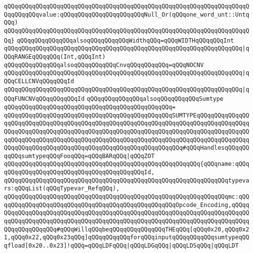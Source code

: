 \verb|qQQqqQQqqQQqqQQqqQQqqQQqqQQqqQQqqQQqqQQqqQQqqQQqqQQqqQQqqQQqqQQqqQQqqQQqqQQqqQQqvalue:qQQqqQQqqQQqqQQqqQQqqQQqNull_Or(qQQqone_word_unt::UntqQQq)|\newline
\verb|qQQqqQQqqQQqqQQqqQQqqQQqqQQqqQQqqQQqqQQqqQQqqQQqqQQqqQQqqQQqqQQqqQQqqQQq}|\newline
\newline
\verb|qQQqqQQqqQQqqQQqalsoqQQqqQQqqQQqWidthqQQq=qQQqWIDTHqQQqqQQqInt|\newline
\verb|qQQqqQQqqQQqqQQqqQQqqQQqqQQqqQQqqQQqqQQqqQQqqQQqqQQqqQQqqQQqqQQqqQQq|\verb#|qQQqRANGEqQQqqQQq(Int,qQQqInt)#\newline
\newline
\verb|qQQqqQQqqQQqqQQqalsoqQQqqQQqqQQqCnvqQQqqQQqqQQq=qQQqNOCNV|\newline
\verb|qQQqqQQqqQQqqQQqqQQqqQQqqQQqqQQqqQQqqQQqqQQqqQQqqQQqqQQqqQQqqQQqqQQq|\verb#|qQQqCELLCNVqQQqqQQqId#\newline
\verb|qQQqqQQqqQQqqQQqqQQqqQQqqQQqqQQqqQQqqQQqqQQqqQQqqQQqqQQqqQQqqQQqqQQq|\verb#|qQQqFUNCNVqQQqqQQqqQQqId#\newline
\newline
\verb|qQQqqQQqqQQqqQQqalsoqQQqqQQqqQQqSumtype|\newline
\verb|qQQqqQQqqQQqqQQqqQQqqQQqqQQqqQQqqQQqqQQqqQQqqQQq=|\newline
\verb|qQQqqQQqqQQqqQQqqQQqqQQqqQQqqQQqqQQqqQQqqQQqqQQqSUMTYPEqQQqqQQqqQQqqQQqqQQqqQQqqQQqqQQqqQQqqQQqqQQqqQQqqQQqqQQqqQQqqQQqqQQqqQQqqQQqqQQqqQQqqQQqqQQqqQQqqQQqqQQqqQQqqQQqqQQqqQQqqQQqqQQqqQQqqQQqqQQqqQQqqQQqqQQqqQQqqQQqqQQqqQQqqQQqqQQqqQQqqQQqqQQqqQQqqQQqqQQqqQQqqQQqqQQqqQQqqQQqqQQqqQQqqQQqqQQqqQQqqQQqqQQqqQQqqQQqqQQqqQQqqQQqqQQqqQQq#qQQqHandlesqQQqqQQqqQQqsumtypeqQQqFooqQQq=qQQqBARqQQq|\verb#|qQQqZOT#\newline
\verb|qQQqqQQqqQQqqQQqqQQqqQQqqQQqqQQqqQQqqQQqqQQqqQQqqQQqqQQq{qQQqname:qQQqqQQqqQQqqQQqqQQqqQQqqQQqqQQqqQQqqQQqqQQqId,|\newline
\verb|qQQqqQQqqQQqqQQqqQQqqQQqqQQqqQQqqQQqqQQqqQQqqQQqqQQqqQQqqQQqqQQqtypevars:qQQqList(qQQqTypevar_RefqQQq),|\newline
\verb|qQQqqQQqqQQqqQQqqQQqqQQqqQQqqQQqqQQqqQQqqQQqqQQqqQQqqQQqqQQqqQQqmc:qQQqqQQqqQQqqQQqqQQqqQQqqQQqqQQqqQQqqQQqqQQqqQQqqQQqOpcode_Encoding,qQQqqQQqqQQqqQQqqQQqqQQqqQQqqQQqqQQqqQQqqQQqqQQqqQQqqQQqqQQqqQQqqQQqqQQqqQQqqQQqqQQqqQQqqQQqqQQqqQQqqQQqqQQqqQQqqQQqqQQqqQQqqQQqqQQqqQQqqQQqqQQqqQQqqQQqqQQqqQQq#qQQqWillqQQqbeqQQqqQQqqQQqqQQqTHEqQQq[qQQq0x20,qQQq0x21,qQQq0x22,qQQq0x23qQQq]qQQqqQQqqQQqforqQQqinputqQQqqQQqqQQqsumtypeqQQqfload[0x20..0x23]!qQQq=qQQqLDFqQQq|\verb#|qQQqLDGqQQq|qQQqLDSqQQq|qQQqLDT#\newline
